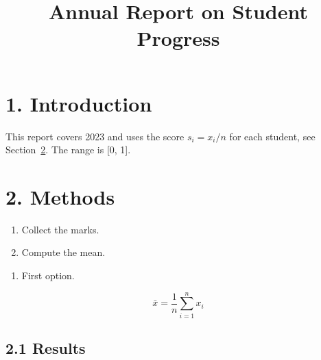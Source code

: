 \documentclass[
]{article}
\title{Annual Report on Student Progress}
\author{}
\date{}
\providecommand{\tightlist}{%
  \setlength{\itemsep}{0pt}\setlength{\parskip}{0pt}}
\begin{document}
\maketitle

\hypertarget{introduction}{%
\section{1. Introduction}\label{introduction}}

This report covers 2023 and uses the score \(s_i = x_i / n\) for each
student, see Section~\ref{methods}. The range is {[}0, 1{]}.

\protect\hypertarget{_Toc12345}{}{}

\hypertarget{methods}{%
\section{2. Methods}\label{methods}}

\begin{enumerate}
\def\labelenumi{\arabic{enumi}.}
\tightlist
\item
  Collect the marks.
\item
  Compute the mean.
\end{enumerate}

\begin{enumerate}
\def\labelenumi{(\alph{enumi})}
\tightlist
\item
  First option.
\end{enumerate}

$$\bar{x} = \frac{1}{n}\sum_{i=1}^{n} x_i$$

\hypertarget{results}{%
\subsection{2.1 Results}\label{results}}
\end{document}
